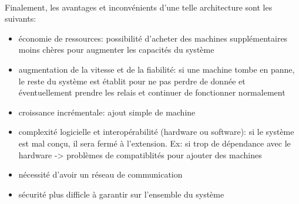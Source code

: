 {\paragraph{}
Finalement, les avantages et inconvénients d'une telle architecture sont les suivants:
\begin{itemize}\setlength{\itemsep}{.3em}
\item[\textcolor{dkgreen}{\ding{52}}] économie de ressources: possibilité d'acheter des machines supplémentaires moins chères pour augmenter les capacités du système
\item[\textcolor{dkgreen}{\ding{52}}] augmentation de la vitesse et de la fiabilité: si une machine tombe en panne, le reste du système est établit pour ne pas perdre de donnée et éventuellement prendre les relais et continuer de fonctionner normalement
\item[\textcolor{dkgreen}{\ding{52}}] croissance incrémentale: ajout simple de machine
\item[\textcolor{dkred}{\ding{56}}] complexité logicielle et interopérabilité (hardware ou software): si le système est mal conçu, il sera fermé à l'extension. Ex: si trop de dépendance avec le hardware -> problèmes de compatiblités pour ajouter des machines
\item[\textcolor{dkred}{\ding{56}}] nécessité d'avoir un réseau de communication
\item[\textcolor{dkred}{\ding{56}}] sécurité plus difficle à garantir sur l'ensemble du système
\end{itemize}


}

